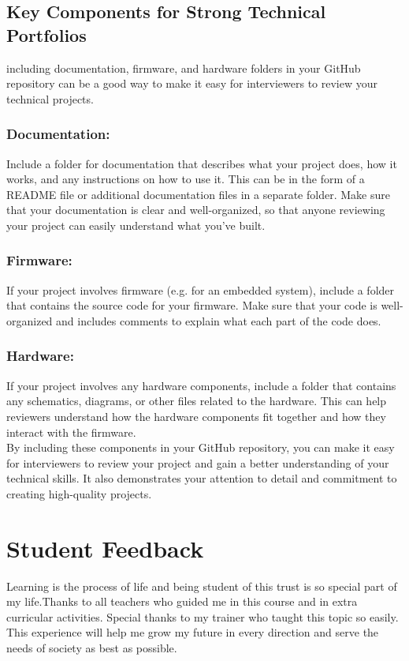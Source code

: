\documentclass[12pt]{article}
\begin{document}
\subsection*{Key Components for Strong Technical Portfolios}
including documentation, firmware, and hardware folders in your GitHub repository can be a good way to make it easy for interviewers to review your technical projects.
\pagebreak
\subsubsection*{Documentation:} 
Include a folder for documentation that describes what your project does, how it works, and any instructions on how to use it. This can be in the form of a README file or additional documentation files in a separate folder. Make sure that your documentation is clear and well-organized, so that anyone reviewing your project can easily understand what you've built.

\subsubsection*{Firmware:}
 If your project involves firmware (e.g. for an embedded system), include a folder that contains the source code for your firmware. Make sure that your code is well-organized and includes comments to explain what each part of the code does.

\subsubsection*{Hardware:}
 If your project involves any hardware components, include a folder that contains any schematics, diagrams, or other files related to the hardware. This can help reviewers understand how the hardware components fit together and how they interact with the firmware.\\

By including these components in your GitHub repository, you can make it easy for interviewers to review your project and gain a better understanding of your technical skills. It also demonstrates your attention to detail and commitment to creating high-quality projects.
\pagebreak
\section*{Student Feedback}
Learning is the process of life and being student of this trust is so special part of my life.Thanks to all teachers who guided me in this course and in extra curricular activities. Special thanks to my trainer who taught this topic so easily. This experience will help me grow my future in every direction and serve the needs of society as best as possible.
\end{document}
